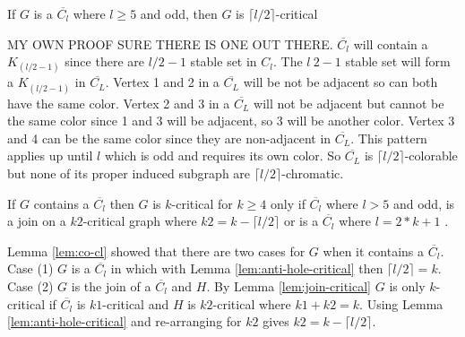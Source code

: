 \begin{Lemma}\label{lem:anti-hole-coloring}
If $G$ is a $\overline{C_l}$ where $l \geq 5$ and odd, then $G$ is $\lceil l/2 \rceil$-critical 
\end{Lemma}
 MY OWN PROOF SURE THERE IS ONE OUT THERE. $\overline{C_l}$ will contain a ${K_(l/2-1)}$ since there are $l / 2 - 1$ stable set in ${C_l}$. The $l \ 2- 1$ stable set will form a ${K_(l/2-1)}$ in $\overline{C_L}$. Vertex 1 and 2 in a $\overline{C_L}$ will be not be adjacent so can both have the same color. Vertex 2 and 3 in a $\overline{C_L}$ will not be adjacent but cannot be the same color since 1 and 3 will be adjacent, so 3 will be another color. Vertex 3 and 4 can be the same color since they are non-adjacent in $\overline{C_L}$. This pattern applies up until $l$ which is odd and requires its own color. So $\overline{C_L}$ is $\lceil l / 2 \rceil$-colorable but none of its proper induced subgraph are $\lceil l/2 \rceil$-chromatic.

\begin{Lemma}\label{lem:co-cl-critical} 
If $G$ contains a $\overline{C_l}$ then $G$ is $k$-critical for $k \geq 4$ only if $\overline{C_l}$ where $l > 5$ and odd, is a join on a $k2$-critical graph where $k2 = k - \lceil l / 2 \rceil$ or is a $\overline{C_l}$ where $l = 2*k+1$ . 
\end{Lemma}
 Lemma \ref{lem:co-cl} showed that there are two cases for $G$ when it contains a $\overline{C_l}$. Case (1) $G$ is a $\overline{C_l}$ in which with Lemma \ref{lem:anti-hole-critical} then $\lceil l / 2 \rceil = k$. Case (2) $G$ is the join of a $\overline{C_l}$ and $H$. By Lemma \ref{lem:join-critical} $G$ is only $k$-critical if $\overline{C_l}$ is $k1$-critical and $H$ is $k2$-critical where $k1 + k2 = k$. Using Lemma \ref{lem:anti-hole-critical} and re-arranging for $k2$ gives $k2 = k - \lceil l / 2 \rceil$.
